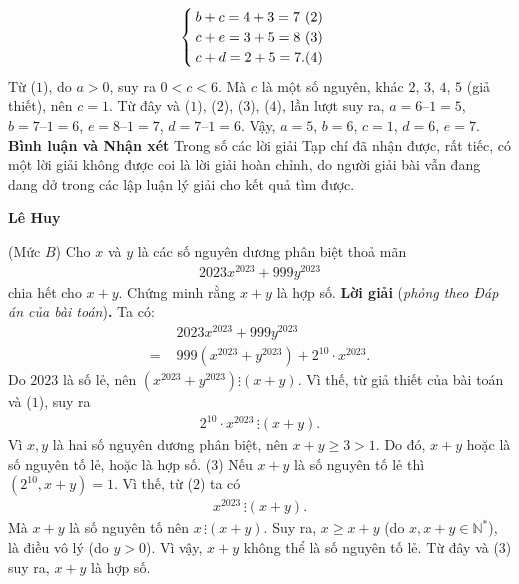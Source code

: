 \begin{multicols}{2}
\begin{align*}
\begin{cases}
			b + c = 4 + 3 = 7 \hfill (2)\\
			c + e = 3 + 5 = 8 \hfill (3)\\
			c + d = 2 + 5 = 7. \hfill (4)
		\end{cases}
	\end{align*}
	Từ ($1$), do $a > 0$, suy ra $0 < c < 6$. Mà $c$ là một số nguyên, khác $2$, $3$, $4$, $5$ (giả thiết), nên $c = 1$. Từ đây và ($1$), ($2$), ($3$), ($4$), lần lượt suy ra, $a = 6 – 1 = 5$, $b = 7 – 1 = 6$, $e = 8 – 1 = 7$, $d = 7 – 1 = 6$.
	\vskip 0.05cm
	Vậy, $a = 5$, $b = 6$, $c = 1$, $d = 6$, $e = 7$.
	\vskip 0.05cm
	\textbf{\color{thachthuctoanhoc}Bình luận và Nhận xét}
	\vskip 0.05cm
	Trong số các lời giải Tạp chí đã nhận được, rất tiếc, có một lời giải không được coi là lời giải hoàn chỉnh, do người giải bài vẫn đang dang dở trong các lập luận lý giải cho kết quả tìm được.
	\begin{flushright}
		\textbf{\color{thachthuctoanhoc}Lê Huy}
	\end{flushright}
	{}
	(Mức $B$) Cho $x$ và $y$ là các số nguyên dương phân biệt thoả mãn
	\begin{align*}
		2023x^{2023}+999 y^{2023}
	\end{align*}
	chia hết cho $x+y$. Chứng minh rằng $x+y$ là hợp số. 
	\vskip 0.05cm
	\textbf{\color{thachthuctoanhoc}Lời giải} (\textit{phỏng theo Đáp án của bài toán})\textbf{\color{thachthuctoanhoc}.}
	\vskip 0.05cm
	Ta có:
	\begin{align*}
		&2023{x^{2023}} + 999{y^{2023}} \\
		= \,\,&999\left( {{x^{2023}} + {y^{2023}}} \right) + {2^{10}} \cdot {x^{2023}}.
	\end{align*}
	Do $2023$ là số lẻ, nên $\left( {{x^{2023}} + {y^{2023}}} \right) \vdots \left( {x + y} \right)$. Vì thế, từ giả thiết của bài toán và ($1$), suy ra
	\begin{align*}
		{2^{10}} \cdot {x^{2023}} \,\vdots \left( {x + y} \right).
	\end{align*}
	Vì $x, y$ là hai số nguyên dương phân biệt, nên $x + y \ge  3 > 1$. Do đó, $x + y$ hoặc là số nguyên tố lẻ, hoặc là hợp số.  
	\hfill ($3$)
	\vskip 0.05cm
	Nếu $x + y$ là số nguyên tố lẻ thì $\left( {{2^{10}},x + y} \right) = 1$.  Vì thế, từ ($2$) ta có
	\begin{align*}
		{x^{2023}} \,\vdots \left( {x + y} \right).
	\end{align*}
	Mà $x + y$ là số nguyên tố nên $x \,\vdots \left( {x + y} \right)$.  Suy ra, $x \ge  x + y$ (do $x, x + y \in \mathbb{N^*}$), là điều vô lý (do $y > 0$). Vì vậy, $x + y$ không thể là số nguyên tố lẻ. Từ đây và ($3$) suy ra, $x + y$ là hợp số.

\end{multicols}
